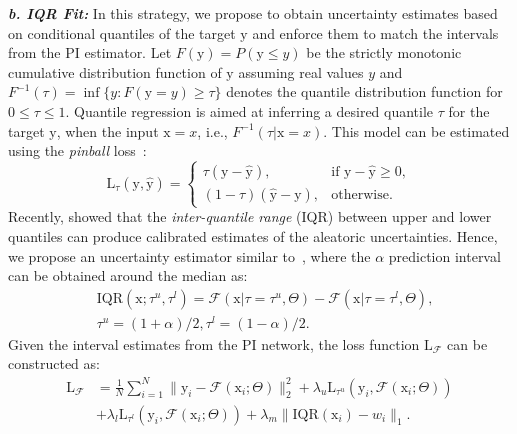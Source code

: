 \documentclass[letterpaper]{article} %
\begin{document}
\noindent \textit{\textbf{b. IQR Fit:}} In this strategy, we propose to obtain uncertainty estimates based on conditional quantiles of the target $\mathrm{y}$ and enforce them to match the intervals from the PI estimator. Let $F(\mathrm{y}) = P(\mathrm{y} \leq y)$ be the strictly monotonic cumulative distribution function of $\mathrm{y}$ assuming real values $y$ and $F^{-1}(\tau) = \inf \{y: F(\mathrm{y}=y) \geq \tau\}$ denotes the quantile distribution function for $0 \leq \tau \leq 1$. Quantile regression is aimed at inferring a desired quantile $\tau$ for the target $\mathrm{y}$, when the input $\mathrm{x} = x$, i.e., $F^{-1}(\tau | \mathrm{x} = x)$. This model can be estimated using the \textit{pinball} loss~\cite{koenker2001quantile}:
\begin{equation}
\mathrm{L}_{\tau}(\mathrm{y},\hat{\mathrm{y}}) =
\begin{cases}
\tau(\mathrm{y} - \hat{\mathrm{y}}) ,& \text{if }\mathrm{y} - \hat{\mathrm{y}} \geq 0, \\
(1-\tau)(\hat{\mathrm{y}} - \mathrm{y}),              & \text{otherwise}.
\end{cases}
\end{equation}Recently, \cite{tagasovska2018frequentist} showed that the \textit{inter-quantile range} (IQR) between upper and lower quantiles can produce calibrated estimates of the aleatoric uncertainties. Hence, we propose an uncertainty estimator similar to~\cite{tagasovska2018frequentist}, where the $\alpha$ prediction interval can be obtained around the median as:
\begin{align}
&\text{IQR}(\mathrm{x}; \tau^u, \tau^l) = \mathcal{F}(\mathrm{x}|\tau = \tau^u, \Theta) - \mathcal{F}(\mathrm{x}|\tau = \tau^l, \Theta), \\
\nonumber&\tau^u = (1 + \alpha)/2, \tau^l = (1 - \alpha)/2.
\end{align}Given the interval estimates from the PI network, the loss function $\mathrm{L}_{\mathcal{F}}$ can be constructed as:
\begin{align} \label{IQR matching}
\nonumber \mathrm{L}_{\mathcal{F}} &=  \frac{1}{N} \sum_{i=1}^N \|\mathrm{y}_i - \mathcal{F}(\mathrm{x}_i; \Theta)\|_2^2 + \lambda_u \mathrm{L}_{\tau^u}(\mathrm{y}_i, \mathcal{F}(\mathrm{x}_i; \Theta)) \\
& + \lambda_l \mathrm{L}_{\tau^l}(\mathrm{y}_i, \mathcal{F}(\mathrm{x}_i; \Theta)) + \lambda_m \|\text{IQR}(\mathrm{x}_i) - w_i \|_1.
\end{align}
\end{document}
